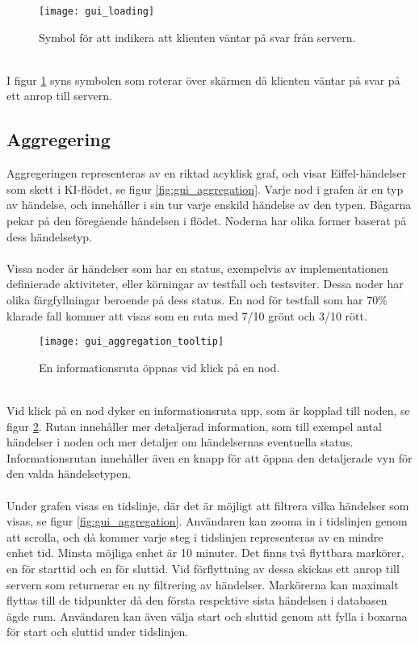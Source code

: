 \begin{figure}[H]
  \centering
  \texttt{[image: gui\_loading]}
  \caption{Symbol för att indikera att klienten väntar på svar från servern.}
  \label{fig:gui_loading}
\end{figure}
\ \\
I figur \ref{fig:gui_loading} syns symbolen som roterar över skärmen då klienten väntar på svar på ett anrop till servern.

\subsection{Aggregering}
Aggregeringen representeras av en riktad acyklisk graf, och visar Eiffel-händelser som skett i KI-flödet, se figur \ref{fig:gui_aggregation}. Varje nod i grafen är en typ av händelse, och innehåller i sin tur varje enskild händelse av den typen. Bågarna pekar på den föregående händelsen i flödet. Noderna har olika former baserat på dess händelsetyp.
\\ \\
Vissa noder är händelser som har en status, exempelvis av implementationen definierade aktiviteter, eller körningar av testfall och testsviter. Dessa noder har olika färgfyllningar beroende på dess status. En nod för testfall som har 70\% klarade fall kommer att visas som en ruta med 7/10 grönt och 3/10 rött. 

\begin{figure}[H]
  \centering
  \texttt{[image: gui\_aggregation\_tooltip]}
  \caption{En informationsruta öppnas vid klick på en nod.}
  \label{fig:gui_aggregation_tooltip}
\end{figure}
\ \\
Vid klick på en nod dyker en informationsruta upp, som är kopplad till noden, se figur \ref{fig:gui_aggregation_tooltip}. Rutan innehåller mer detaljerad information, som till exempel antal händelser i noden och mer detaljer om händelsernas eventuella status. Informationsrutan innehåller även en knapp för att öppna den detaljerade vyn för den valda händelsetypen.
\\ \\
Under grafen visas en tidslinje, där det är möjligt att filtrera vilka händelser som visas, se figur \ref{fig:gui_aggregation}. Användaren kan zooma in i tidslinjen genom att scrolla, och då kommer varje steg i tidslinjen representeras av en mindre enhet tid. Minsta möjliga enhet är 10 minuter. 
Det finns två flyttbara markörer, en för starttid och en för sluttid. Vid förflyttning av dessa skickas ett anrop till servern som returnerar en ny filtrering av händelser. Markörerna kan maximalt flyttas till de tidpunkter då den första respektive sista händelsen i databasen ägde rum. Användaren kan även välja start och sluttid genom att fylla i boxarna för start och sluttid under tidslinjen.

